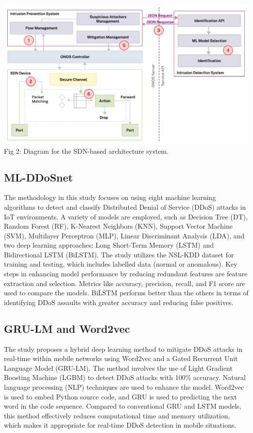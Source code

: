 \documentclass[a4paper, 12pt]{article}
\begin{document}
\includegraphics[scale=0.3]{IMG_0250.jpeg} \\
Fig 2: Diagram for the SDN-based architecture system. 

\subsection{ML-DDoSnet} 
The methodology in this study focuses on using eight machine learning algorithms to detect and classify Distributed Denial of Service (DDoS) attacks in IoT environments. A variety of models are employed, such as Decision Tree (DT), Random Forest (RF), K-Nearest Neighbors (KNN), Support Vector Machine (SVM), Multilayer Perceptron (MLP), Linear Discriminant Analysis (LDA), and two deep learning approaches: Long Short-Term Memory (LSTM) and Bidirectional LSTM (BiLSTM). The study utilizes the NSL-KDD dataset for training and testing, which includes labelled data (normal or anomalous). Key steps in enhancing model performance by reducing redundant features are feature extraction and selection. Metrics like accuracy, precision, recall, and F1 score are used to compare the models. BiLSTM performs better than the others in terms of identifying DDoS assaults with greater accuracy and reducing false positives. 

\subsection{GRU-LM and Word2vec}
The study proposes a hybrid deep learning method to mitigate DDoS attacks in real-time within mobile networks using Word2vec and a Gated Recurrent Unit Language Model (GRU-LM). The method involves the use of Light Gradient Boosting Machine (LGBM) to detect DDoS attacks with 100\% accuracy. Natural language processing (NLP) techniques are used to enhance the model. Word2vec is used to embed Python source code, and GRU is used to predicting the next word in the code sequence. Compared to conventional GRU and LSTM models, this method effectively reduces computational time and memory utilization, which makes it appropriate for real-time DDoS detection in mobile situations. 
\end{document}
